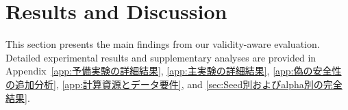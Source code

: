 \documentclass{article}
\begin{document}




\section{Results and Discussion}

This section presents the main findings from our validity-aware evaluation. Detailed experimental results and supplementary analyses are provided in Appendix~\ref{app:予備実験の詳細結果}, \ref{app:主実験の詳細結果}, \ref{app:偽の安全性の追加分析}, \ref{app:計算資源とデータ要件}, and \ref{sec:Seed別およびalpha別の完全結果}.
\end{document}
